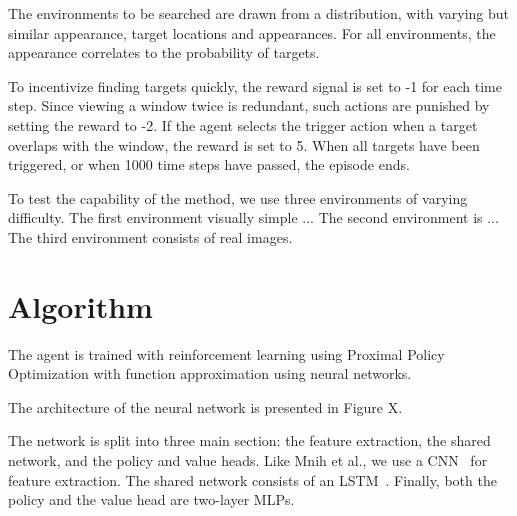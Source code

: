 The environments to be searched are drawn from a distribution, with varying but similar appearance, target locations and appearances.
For all environments, the appearance correlates to the probability of targets.

To incentivize finding targets quickly, the reward signal is set to -1 for each time step.
Since viewing a window twice is redundant, such actions are punished by setting the reward to -2.
If the agent selects the trigger action when a target overlaps with the window, the reward is set to 5.
When all targets have been triggered, or when 1000 time steps have passed, the episode ends.

To test the capability of the method, we use three environments of varying difficulty.
The first environment visually simple ...
The second environment is ...
The third environment consists of real images.



\section{Algorithm}
\label{sec:algorithm}

The agent is trained with reinforcement learning using Proximal Policy Optimization with function approximation using neural networks. 

The architecture of the neural network is presented in Figure X.

The network is split into three main section: the feature extraction, the shared network, and the policy and value heads.
Like Mnih et al., we use a CNN~\cite{} for feature extraction.
The shared network consists of an LSTM~\cite{hochreiter}.
Finally, both the policy and the value head are two-layer MLPs.




